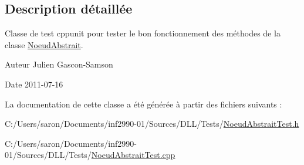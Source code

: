 \subsection{Description détaillée}
Classe de test cppunit pour tester le bon fonctionnement des méthodes de la classe \hyperlink{class_noeud_abstrait}{Noeud\-Abstrait}. 

\begin{DoxyAuthor}{Auteur}
Julien Gascon-\/\-Samson 
\end{DoxyAuthor}
\begin{DoxyDate}{Date}
2011-\/07-\/16 
\end{DoxyDate}


La documentation de cette classe a été générée à partir des fichiers suivants \-:\begin{DoxyCompactItemize}
\item 
C\-:/\-Users/saron/\-Documents/inf2990-\/01/\-Sources/\-D\-L\-L/\-Tests/\hyperlink{_noeud_abstrait_test_8h}{Noeud\-Abstrait\-Test.\-h}\item 
C\-:/\-Users/saron/\-Documents/inf2990-\/01/\-Sources/\-D\-L\-L/\-Tests/\hyperlink{_noeud_abstrait_test_8cpp}{Noeud\-Abstrait\-Test.\-cpp}\end{DoxyCompactItemize}
